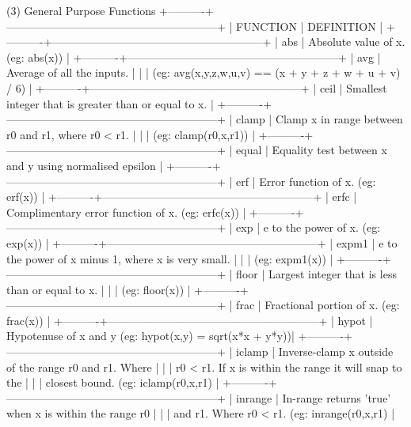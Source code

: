 (3) General Purpose Functions
+----------+---------------------------------------------------------+
| FUNCTION | DEFINITION                                              |
+----------+---------------------------------------------------------+
| abs      | Absolute value of x.  (eg: abs(x))                      |
+----------+---------------------------------------------------------+
| avg      | Average of all the inputs.                              |
|          | (eg: avg(x,y,z,w,u,v) == (x + y + z + w + u + v) / 6)   |
+----------+---------------------------------------------------------+
| ceil     | Smallest integer that is greater than or equal to x.    |
+----------+---------------------------------------------------------+
| clamp    | Clamp x in range between r0 and r1, where r0 < r1.      |
|          | (eg: clamp(r0,x,r1))                                    |
+----------+---------------------------------------------------------+
| equal    | Equality test between x and y using normalised epsilon  |
+----------+---------------------------------------------------------+
| erf      | Error function of x.  (eg: erf(x))                      |
+----------+---------------------------------------------------------+
| erfc     | Complimentary error function of x.  (eg: erfc(x))       |
+----------+---------------------------------------------------------+
| exp      | e to the power of x.  (eg: exp(x))                      |
+----------+---------------------------------------------------------+
| expm1    | e to the power of x minus 1, where x is very small.     |
|          | (eg: expm1(x))                                          |
+----------+---------------------------------------------------------+
| floor    | Largest integer that is less than or equal to x.        |
|          | (eg: floor(x))                                          |
+----------+---------------------------------------------------------+
| frac     | Fractional portion of x.  (eg: frac(x))                 |
+----------+---------------------------------------------------------+
| hypot    | Hypotenuse of x and y (eg: hypot(x,y) = sqrt(x*x + y*y))|
+----------+---------------------------------------------------------+
| iclamp   | Inverse-clamp x outside of the range r0 and r1. Where   |
|          | r0 < r1. If x is within the range it will snap to the   |
|          | closest bound. (eg: iclamp(r0,x,r1)                     |
+----------+---------------------------------------------------------+
| inrange  | In-range returns 'true' when x is within the range r0   |
|          | and r1. Where r0 < r1.  (eg: inrange(r0,x,r1)           |
